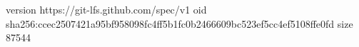 version https://git-lfs.github.com/spec/v1
oid sha256:ccec2507421a95bf958098fc4ff5b1fc0b2466609bc523ef5cc4ef5108ffe0fd
size 87544
